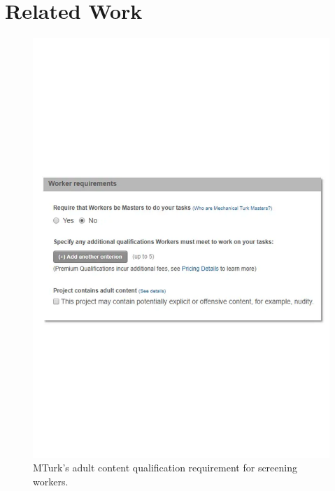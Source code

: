 \section{Related Work}
\begin{figure}
  \centering
  \includegraphics[width=0.6\linewidth]{figures/mturk_adult_qualification.pdf}
  \caption{MTurk’s adult content qualification requirement for screening workers.}
  \label{fig:mturk_adult}
\end{figure}


